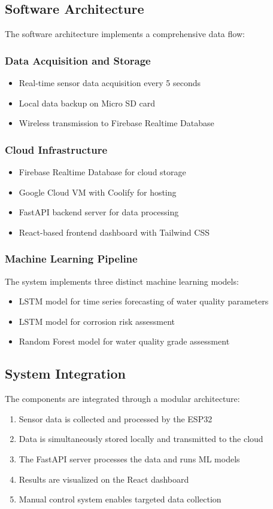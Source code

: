 \documentclass[conference]{IEEEtran}
\begin{document}
\subsection{Software Architecture}
The software architecture implements a comprehensive data flow:

\subsubsection{Data Acquisition and Storage}
\begin{itemize}
\item Real-time sensor data acquisition every 5 seconds
\item Local data backup on Micro SD card
\item Wireless transmission to Firebase Realtime Database
\end{itemize}

\subsubsection{Cloud Infrastructure}
\begin{itemize}
\item Firebase Realtime Database for cloud storage
\item Google Cloud VM with Coolify for hosting
\item FastAPI backend server for data processing
\item React-based frontend dashboard with Tailwind CSS
\end{itemize}

\subsubsection{Machine Learning Pipeline}
The system implements three distinct machine learning models:
\begin{itemize}
\item LSTM model for time series forecasting of water quality parameters
\item LSTM model for corrosion risk assessment
\item Random Forest model for water quality grade assessment
\end{itemize}

\subsection{System Integration}
The components are integrated through a modular architecture:
\begin{enumerate}
\item Sensor data is collected and processed by the ESP32
\item Data is simultaneously stored locally and transmitted to the cloud
\item The FastAPI server processes the data and runs ML models
\item Results are visualized on the React dashboard
\item Manual control system enables targeted data collection
\end{enumerate}
\end{document}
